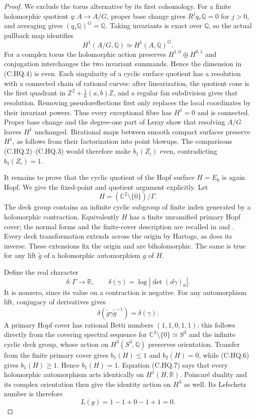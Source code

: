 \begin{proof}
We exclude the torus alternative by its first
cohomology. For a finite holomorphic quotient
$q:A\to A/G$, proper base change gives
$R^jq_*\mathbb Q=0$ for $j>0$, and averaging gives
$(q_*\mathbb Q)^G=\mathbb Q$. Taking invariants is
exact over $\mathbb Q$, so the actual pullback map
identifies
\[
                     H^1(A/G,\mathbb Q)
                          \simeq H^1(A,\mathbb Q)^G.
 \tag{C.HQ.4}
\]
For a complex torus the holomorphic action preserves
$H^{1,0}\oplus H^{0,1}$ and conjugation interchanges
the two invariant summands. Hence the dimension in
(C.HQ.4) is even. Each singularity of a cyclic surface
quotient has a resolution with a connected chain
of rational curves: after linearization, the
quotient cone is the first quadrant in
$\mathbb Z^2+\frac1n(a,b)\mathbb Z$, and a regular
fan subdivision gives that resolution. Removing
pseudoreflections first only replaces the local
coordinates by their invariant powers. Thus every
exceptional fibre has $H^1=0$ and is connected.
Proper base change and the degree-one part of
Leray show that resolving $A/G$ leaves $H^1$
unchanged. Birational maps between smooth compact
surfaces preserve $H^1$, as follows from their
factorization into point blowups. The comparisons
(C.HQ.2)--(C.HQ.3) would therefore make $b_1(Z_i)$
even, contradicting $b_1(Z_i)=1$.

It remains to prove that the cyclic quotient of
the Hopf surface $H=E_0$ is again Hopf. We give
the fixed-point and quotient argument explicitly.
Let
\[
            H=(\mathbb C^2\setminus\{0\})/\Gamma.
 \tag{C.HQ.5}
\]
The deck group contains an infinite cyclic
subgroup of finite index generated by a
holomorphic contraction. Equivalently $H$ has
a finite unramified primary Hopf cover; the
normal forms and the finite-cover description
are recalled in \cite[\S1.1]{Nakamura2008VII}
and \cite[Theorem~2.1]{Khaled2024Hopf}.
Every deck transformation extends across the
origin by Hartogs, as does its inverse. These
extensions fix the origin and are biholomorphic.
The same is true for any lift $\widetilde g$
of a holomorphic automorphism $g$ of $H$.

Define the real character
\[
 \delta:\Gamma\longrightarrow\mathbb R,
 \qquad \delta(\gamma)=\log|\det(d\gamma)_0|.
 \tag{C.HQ.6}
\]
It is nonzero, since its value on a contraction
is negative. For any automorphism lift,
conjugacy of derivatives gives
\[
 \delta(\widetilde g\gamma\widetilde g^{-1})
                         =\delta(\gamma).
 \tag{C.HQ.7}
\]
A primary Hopf cover has rational Betti numbers
$(1,1,0,1,1)$: this follows directly from the
covering spectral sequence for
$\mathbb C^2\setminus\{0\}\simeq S^3$ and the
infinite cyclic deck group, whose action on
$H^3(S^3,\mathbb Q)$ preserves orientation.
Transfer from the finite primary cover gives
$b_1(H)\le1$ and $b_2(H)=0$, while (C.HQ.6)
gives $b_1(H)\ge1$. Hence $b_1(H)=1$.
Equation (C.HQ.7) says that every holomorphic
automorphism acts identically on $H^1(H,\mathbb R)$.
Poincar\'e duality and its complex orientation
then give the identity action on $H^3$ as well.
Its Lefschetz number is therefore
\[
                 L(g)=1-1+0-1+1=0.
 \tag{C.HQ.8}
\]


\end{proof}
